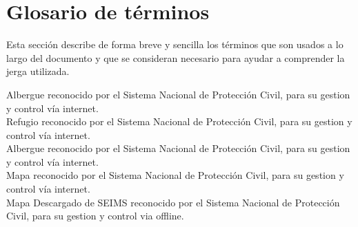 \section{Glosario de términos}

	Esta sección describe de forma breve y sencilla los términos que son usados a lo largo del documento y que se consideran necesario para ayudar a comprender la jerga utilizada.


	
\begin{bGlosario}
	
	
	 Albergue reconocido por el Sistema Nacional de Protección Civil, para su gestion y control vía internet.\\%
	
	 Refugio reconocido por el Sistema Nacional de Protección Civil, para su gestion y control vía internet.\\
	 Albergue reconocido por el Sistema Nacional de Protección Civil, para su gestion y control vía internet.\\
	 Mapa reconocido por el Sistema Nacional de Protección Civil, para su gestion y control vía internet.\\
	 Mapa Descargado de SEIMS reconocido por el Sistema Nacional de Protección Civil, para su gestion y control via offline.

	

	
	
 
\end{bGlosario}



